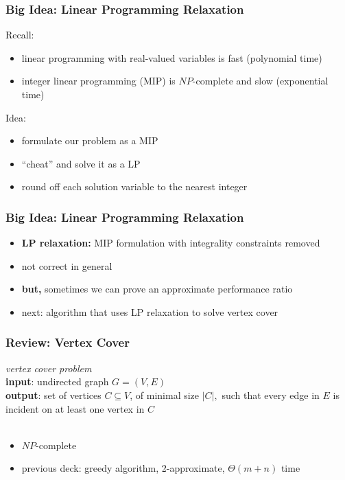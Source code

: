 \documentclass[10pt,aspectratio=169]{beamer}
\newcommand{\stanza}{ \\~\ }
\begin{document}
\begin{frame} \frametitle{Big Idea: Linear Programming Relaxation}
Recall:
\begin{itemize}
  \item linear programming with real-valued variables is fast (polynomial time)
  \item integer linear programming (MIP) is $NP$-complete and slow (exponential time)
\end{itemize}

Idea:
\begin{itemize}
  \item formulate our problem as a MIP
  \item ``cheat'' and solve it as a LP
  \item round off each solution variable to the nearest integer
\end{itemize}
\end{frame}

\begin{frame} \frametitle{Big Idea: Linear Programming Relaxation}
\begin{itemize}
  \item \textbf{LP relaxation:} MIP formulation with integrality constraints removed
  \item not correct in general
  \item \textbf{but,} sometimes we can prove an approximate performance ratio
  \item next: algorithm that uses LP relaxation to solve vertex cover
\end{itemize}
\end{frame}

\begin{frame} \frametitle{Review: Vertex Cover}
  \emph{vertex cover problem} \\
  \textbf{input}: undirected graph $G=(V,E)$ \\
  \textbf{output}: set of vertices $C \subseteq V$, of minimal size $|C|,$ such
    that every edge in $E$ is incident on at least one vertex in $C$
   \stanza
  \begin{itemize}
    \item $NP$-complete
    \item previous deck: greedy algorithm, 2-approximate, $\Theta(m+n)$ time
  \end{itemize}
\end{frame}
\end{document}
